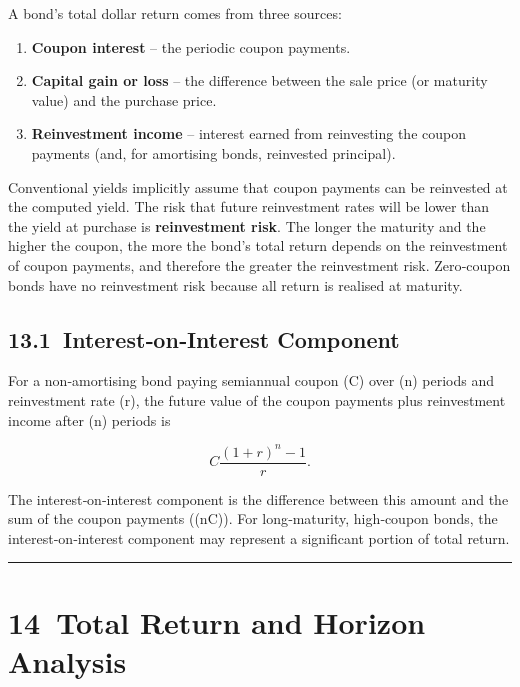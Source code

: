 \documentclass[
  letterpaper,
  DIV=11,
  numbers=noendperiod]{scrartcl}
\providecommand{\tightlist}{%
  \setlength{\itemsep}{0pt}\setlength{\parskip}{0pt}}
\begin{document}
A bond's total dollar return comes from three sources:

\begin{enumerate}
\def\labelenumi{\arabic{enumi}.}
\tightlist
\item
  \textbf{Coupon interest} -- the periodic coupon payments.
\item
  \textbf{Capital gain or loss} -- the difference between the sale price
  (or maturity value) and the purchase price.
\item
  \textbf{Reinvestment income} -- interest earned from reinvesting the
  coupon payments (and, for amortising bonds, reinvested principal).
\end{enumerate}

Conventional yields implicitly assume that coupon payments can be
reinvested at the computed yield. The risk that future reinvestment
rates will be lower than the yield at purchase is \textbf{reinvestment
risk}. The longer the maturity and the higher the coupon, the more the
bond's total return depends on the reinvestment of coupon payments, and
therefore the greater the reinvestment risk. Zero‑coupon bonds have no
reinvestment risk because all return is realised at maturity.

\subsection{13.1~Interest‑on‑Interest
Component}\label{interestoninterest-component}

For a non‑amortising bond paying semiannual coupon (C) over (n) periods
and reinvestment rate (r), the future value of the coupon payments plus
reinvestment income after (n) periods is

\[
 C \frac{(1+r)^n - 1}{r}.
\]

The interest‑on‑interest component is the difference between this amount
and the sum of the coupon payments ((nC)). For long‑maturity,
high‑coupon bonds, the interest‑on‑interest component may represent a
significant portion of total return.

\begin{center}\rule{0.5\linewidth}{0.5pt}\end{center}

\section{14~Total Return and Horizon
Analysis}\label{total-return-and-horizon-analysis}
\end{document}
